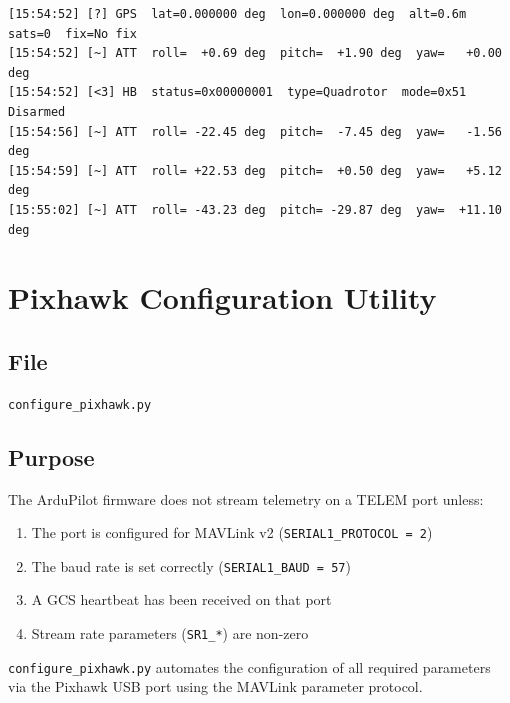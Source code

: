 \documentclass[11pt,a4paper]{article}
\begin{document}
\begin{lstlisting}[language={},
    caption={Example GCS terminal output during live test session}]
[15:54:52] [?] GPS  lat=0.000000 deg  lon=0.000000 deg  alt=0.6m  sats=0  fix=No fix
[15:54:52] [~] ATT  roll=  +0.69 deg  pitch=  +1.90 deg  yaw=   +0.00 deg
[15:54:52] [<3] HB  status=0x00000001  type=Quadrotor  mode=0x51  Disarmed
[15:54:56] [~] ATT  roll= -22.45 deg  pitch=  -7.45 deg  yaw=   -1.56 deg
[15:54:59] [~] ATT  roll= +22.53 deg  pitch=  +0.50 deg  yaw=   +5.12 deg
[15:55:02] [~] ATT  roll= -43.23 deg  pitch= -29.87 deg  yaw=  +11.10 deg
\end{lstlisting}

\newpage

\section{Pixhawk Configuration Utility}
\label{sec:config}

\subsection{File}
\begin{center}
    \texttt{configure\_pixhawk.py}
\end{center}

\subsection{Purpose}

The ArduPilot firmware does not stream telemetry on a TELEM port unless:
\begin{enumerate}
    \item The port is configured for MAVLink v2 (\texttt{SERIAL1\_PROTOCOL = 2})
    \item The baud rate is set correctly (\texttt{SERIAL1\_BAUD = 57})
    \item A GCS heartbeat has been received on that port
    \item Stream rate parameters (\texttt{SR1\_*}) are non-zero
\end{enumerate}

\texttt{configure\_pixhawk.py} automates the configuration of all required
parameters via the Pixhawk USB port using the MAVLink parameter protocol.
\end{document}

